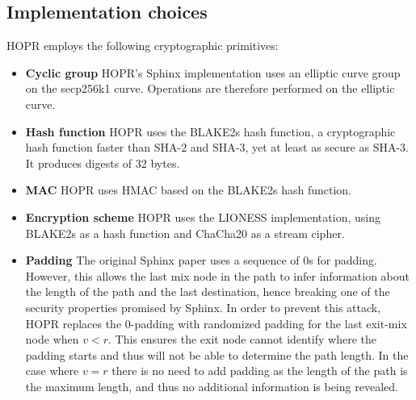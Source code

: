 \subsection{Implementation choices}

HOPR employs the following cryptographic primitives:

\begin{itemize}
    \item \textbf{Cyclic group} HOPR's Sphinx implementation uses an elliptic curve group on the secp256k1 curve. Operations are therefore performed on the elliptic curve.

    \item \textbf{Hash function} HOPR uses the BLAKE2s hash function, a cryptographic hash function faster than SHA-2 and SHA-3, yet at least as secure as SHA-3. It produces digests of 32 bytes.

    \item \textbf{MAC} HOPR uses HMAC based on the BLAKE2s hash function.

    \item \textbf{Encryption scheme} HOPR uses the LIONESS \cite{lionesspaper} implementation, using BLAKE2s as a hash function and ChaCha20 as a stream cipher.

    \item \textbf{Padding} The original Sphinx paper uses a sequence of 0s for padding. However, this allows the last mix node in the path to infer information about the length of the path and the last destination, hence breaking one of the security properties promised by Sphinx. In order to prevent this attack, HOPR replaces the 0-padding with randomized padding for the last exit-mix node when $v<r$. This ensures the exit node cannot identify where the padding starts and thus will not be able to determine the path length. In the case where $v=r$ there is no need to add padding as the length of the path is the maximum length, and thus no additional information is being revealed.

\end{itemize}
